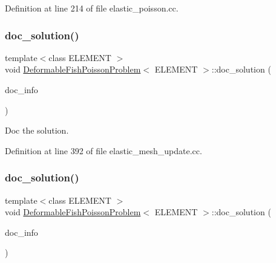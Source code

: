 Definition at line 214 of file elastic\+\_\+poisson.\+cc.

\mbox{\label{classDeformableFishPoissonProblem_aee9b59f35d1ae98cda29fba0c01b226a}} 
\subsubsection{\texorpdfstring{doc\+\_\+solution()}{doc\_solution()}\hspace{0.1cm}{\footnotesize\ttfamily [1/2]}}
{\footnotesize\ttfamily template$<$class E\+L\+E\+M\+E\+NT $>$ \\
void \hyperlink{classDeformableFishPoissonProblem}{Deformable\+Fish\+Poisson\+Problem}$<$ E\+L\+E\+M\+E\+NT $>$\+::doc\+\_\+solution (\begin{DoxyParamCaption}\item[{Doc\+Info \&}]{doc\+\_\+info }\end{DoxyParamCaption})}



Doc the solution. 



Definition at line 392 of file elastic\+\_\+mesh\+\_\+update.\+cc.

\mbox{\label{classDeformableFishPoissonProblem_aee9b59f35d1ae98cda29fba0c01b226a}} 
\subsubsection{\texorpdfstring{doc\+\_\+solution()}{doc\_solution()}\hspace{0.1cm}{\footnotesize\ttfamily [2/2]}}
{\footnotesize\ttfamily template$<$class E\+L\+E\+M\+E\+NT $>$ \\
void \hyperlink{classDeformableFishPoissonProblem}{Deformable\+Fish\+Poisson\+Problem}$<$ E\+L\+E\+M\+E\+NT $>$\+::doc\+\_\+solution (\begin{DoxyParamCaption}\item[{Doc\+Info \&}]{doc\+\_\+info }\end{DoxyParamCaption})}




